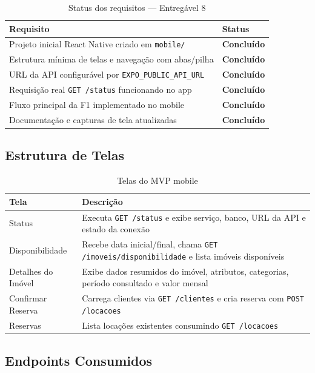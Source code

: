 \documentclass[12pt, a4paper]{article}
\newcommand{\thead}[1]{\cellcolor{tableheader}\color{white}\bfseries #1}
\newcommand{\talt}{\rowcolor{tablerowalt}}
\newcommand{\tok}{\textcolor{successgreen}{\textbf{Concluído}}}
\begin{document}
\begin{table}[H]
\centering
\begin{tabularx}{\textwidth}{|X|l|}
\hline
\thead{Requisito} & \thead{Status} \\
\hline
Projeto inicial React Native criado em \texttt{mobile/} & \tok \\
\talt Estrutura mínima de telas e navegação com abas/pilha & \tok \\
URL da API configurável por \texttt{EXPO\_PUBLIC\_API\_URL} & \tok \\
\talt Requisição real \texttt{GET /status} funcionando no app & \tok \\
Fluxo principal da F1 implementado no mobile & \tok \\
\talt Documentação e capturas de tela atualizadas & \tok \\
\hline
\end{tabularx}
\caption{Status dos requisitos — Entregável 8}
\end{table}

\subsection{Estrutura de Telas}

\begin{table}[H]
\centering
\begin{tabularx}{\textwidth}{|l|X|}
\hline
\thead{Tela} & \thead{Descrição} \\
\hline
Status & Executa \texttt{GET /status} e exibe serviço, banco, URL da API e estado da conexão \\
\talt Disponibilidade & Recebe data inicial/final, chama \texttt{GET /imoveis/disponibilidade} e lista imóveis disponíveis \\
Detalhes do Imóvel & Exibe dados resumidos do imóvel, atributos, categorias, período consultado e valor mensal \\
\talt Confirmar Reserva & Carrega clientes via \texttt{GET /clientes} e cria reserva com \texttt{POST /locacoes} \\
Reservas & Lista locações existentes consumindo \texttt{GET /locacoes} \\
\hline
\end{tabularx}
\caption{Telas do MVP mobile}
\end{table}

\subsection{Endpoints Consumidos}
\end{document}
